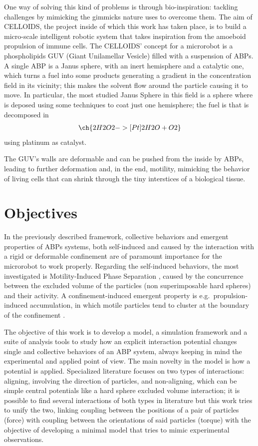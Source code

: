 \documentclass[../../master_thesis_np.tex]{subfiles}
\begin{document}
	One way of solving this kind of problems is through bio-inspiration: tackling challenges by mimicking the gimmicks nature uses to overcome them. The aim of CELLOIDS, the project inside of which this work has taken place, is to build a micro-scale intelligent robotic system that takes inspiration from the amoeboid propulsion of immune cells. The CELLOIDS’ concept for a microrobot is a phospholipids GUV (Giant Unilamellar Vesicle) filled with a suspension of ABPs. A single ABP is a Janus sphere, with an inert hemisphere and a catalytic one, which turns a fuel into some products generating a gradient in the concentration field in its vicinity; this makes the solvent flow around the particle causing it to move. In particular, the most studied Janus Sphere in this field is a  sphere where  is deposed using some techniques to coat just one hemisphere; the fuel is  that is decomposed in 
	\begin{align}
		\ch{2 H2O2 ->[Pt] 2 H2O + O2}
	\end{align}
	using platinum as catalyst.
	
	The GUV’s walls are deformable and can be pushed from the inside by ABPs, leading to further deformation and, in the end, motility, mimicking the behavior of living cells that can shrink through the tiny interstices of a biological tissue.
	
	\section{Objectives}	
	In the previously described framework, collective behaviors and emergent properties of ABPs systems, both self-induced and caused by the interaction with a rigid or deformable confinement are of paramount importance for the microrobot to work properly. Regarding the self-induced behaviors, the most investigated is Motility-Induced Phase Separation \parencite{cates_motility-induced_2015}, caused by the concurrence between the excluded volume of the particles (non superimposable hard spheres) and their activity. A confinement-induced emergent property is e.g.~propulsion-induced accumulation, in which motile particles tend to cluster at the boundary of the confinement \parencite{marconi_towards_2015}.
	
	The objective of this work is to develop a model, a simulation framework and a suite of analysis tools to study how an explicit interaction potential changes single and collective behaviors of an ABP system, always keeping in mind the experimental and applied point of view. The main novelty in the model is how a potential is applied. Specialized literature focuses on two types of interactions: aligning, involving the direction of particles, and non-aligning, which can be simple central potentials like a hard sphere excluded volume interaction; it is possible to find several interactions of both types in literature but this work tries to unify the two, linking coupling between the positions of a pair of particles (force) with coupling between the orientations of said particles (torque) with the objective of developing a minimal model that tries to mimic experimental observations.
	
\end{document}
